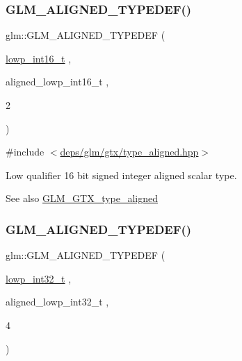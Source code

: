 \subsubsection{\texorpdfstring{G\+L\+M\+\_\+\+A\+L\+I\+G\+N\+E\+D\+\_\+\+T\+Y\+P\+E\+D\+E\+F()}{GLM\_ALIGNED\_TYPEDEF()}\hspace{0.1cm}{\footnotesize\ttfamily [6/209]}}
{\footnotesize\ttfamily glm\+::\+G\+L\+M\+\_\+\+A\+L\+I\+G\+N\+E\+D\+\_\+\+T\+Y\+P\+E\+D\+EF (\begin{DoxyParamCaption}\item[{\hyperlink{group__gtc__type__precision_gae34c3d53c4c1434fc9f26538b0185667}{lowp\+\_\+int16\+\_\+t}}]{,  }\item[{aligned\+\_\+lowp\+\_\+int16\+\_\+t}]{,  }\item[{2}]{ }\end{DoxyParamCaption})}



{\ttfamily \#include $<$\hyperlink{gtx_2type__aligned_8hpp}{deps/glm/gtx/type\+\_\+aligned.\+hpp}$>$}

Low qualifier 16 bit signed integer aligned scalar type. \begin{DoxySeeAlso}{See also}
\hyperlink{group__gtx__type__aligned}{G\+L\+M\+\_\+\+G\+T\+X\+\_\+type\+\_\+aligned} 
\end{DoxySeeAlso}
\mbox{\label{group__gtx__type__aligned_ga8130ea381d76a2cc34a93ccbb6cf487d}} 
\subsubsection{\texorpdfstring{G\+L\+M\+\_\+\+A\+L\+I\+G\+N\+E\+D\+\_\+\+T\+Y\+P\+E\+D\+E\+F()}{GLM\_ALIGNED\_TYPEDEF()}\hspace{0.1cm}{\footnotesize\ttfamily [7/209]}}
{\footnotesize\ttfamily glm\+::\+G\+L\+M\+\_\+\+A\+L\+I\+G\+N\+E\+D\+\_\+\+T\+Y\+P\+E\+D\+EF (\begin{DoxyParamCaption}\item[{\hyperlink{group__gtc__type__precision_gad9567c806dc39f534174eef42663119d}{lowp\+\_\+int32\+\_\+t}}]{,  }\item[{aligned\+\_\+lowp\+\_\+int32\+\_\+t}]{,  }\item[{4}]{ }\end{DoxyParamCaption})}



